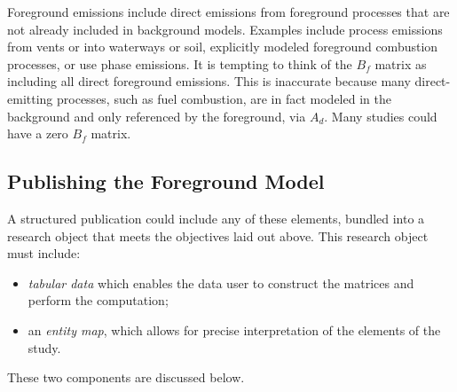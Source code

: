 Foreground emissions include direct emissions from foreground processes that are not already included in background models.  Examples include process emissions from vents or into waterways or soil, explicitly modeled foreground combustion processes, or use phase emissions.  It is tempting to think of the $B_f$ matrix as including all direct foreground emissions.  This is inaccurate because many direct-emitting  processes, such as fuel combustion, are in fact modeled in the background and only referenced by the foreground, via $A_d$.  Many studies could have a zero $B_f$ matrix.

\subsection{Publishing the Foreground Model}

A structured publication could include any of these elements, bundled into a research object that meets the objectives laid out above.  This research object must include:
\begin{itemize}
\item \emph{tabular data} which enables the data user to construct the matrices and perform the computation;
\item an \emph{entity map}, which allows for precise interpretation of the elements of the study.
\end{itemize}
These two components are discussed below.







